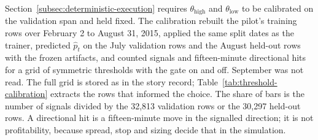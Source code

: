 Section~\ref{subsec:deterministic-execution} requires $\theta_{\text{high}}$ and $\theta_{\text{low}}$ to be calibrated on the validation span and held fixed. The calibration rebuilt the pilot's training rows over February 2 to August 31, 2015, applied the same split dates as the trainer, predicted $\hat{p}_t$ on the July validation rows and the August held-out rows with the frozen artifacts, and counted signals and fifteen-minute directional hits for a grid of symmetric thresholds with the gate on and off. September was not read. The full grid is stored as  in the story record; Table~\ref{tab:threshold-calibration} extracts the rows that informed the choice. The share of bars is the number of signals divided by the 32,813 validation rows or the 30,297 held-out rows. A directional hit is a fifteen-minute move in the signalled direction; it is not profitability, because spread, stop and sizing decide that in the simulation.

